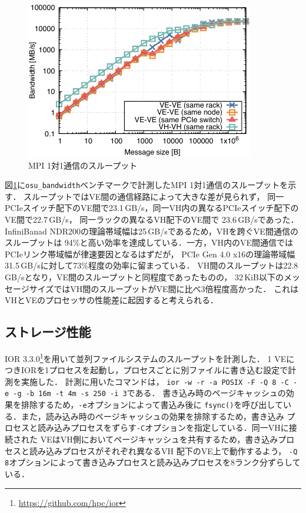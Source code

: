 ﻿\documentclass[submit,techrep,noauthor]{ipsj}
\begin{document}
\begin{figure}[tb]
  \centering
  \includegraphics{figs/mpi_bandwidth.pdf}
  \caption{MPI 1対1通信のスループット}\label{fig:mpi-bw}
\end{figure}

図\ref{fig:mpi-bw}に\verb|osu_bandwidth|ベンチマークで計測したMPI 1対1通信のスループットを示す．
スループットではVE間の通信経路によって大きな差が見られず，
同一PCIeスイッチ配下のVE間で23.1\,GB/s，同一VH内の異なるPCIeスイッチ配下のVE間で22.7\,GB/s，
同一ラックの異なるVH配下のVE間で 23.6\,GB/sであった．
InfiniBanad NDR200の理論帯域幅は25\,GB/sであるため，VHを跨ぐVE間通信のスループットは
94\%と高い効率を達成している．一方，VH内のVE間通信ではPCIeリンク帯域幅が律速要因となるはずだが，
PCIe Gen 4.0 x16の理論帯域幅31.5\,GB/sに対して73\%程度の効率に留まっている．
VH間のスループットは22.8\,GB/sとなり，VE間のスループットと同程度であったものの，
32\,KiB以下のメッセージサイズではVH間のスループットがVE間に比べ3倍程度高かった．
これはVHとVEのプロセッサの性能差に起因すると考えられる．

\subsection{ストレージ性能}\label{sec:storage}

IOR 3.3.0\footnote{\url{https://github.com/hpc/ior}}を用いて並列ファイルシステムのスループットを計測した．
1 VEにつきIORを1プロセスを起動し，プロセスごとに別ファイルに書き込む設定で計測を実施した．
計測に用いたコマンドは，
\texttt{ior -w -r -a POSIX -F -Q 8 -C -e -g -b 16m -t 4m -s 250 -i 3}である．
書き込み時のページキャッシュの効果を排除するため，\texttt{-e}オプションによって書込み後に
\texttt{fsync()}を呼び出している．また，読み込み時のページキャッシュの効果を排除するため，書き込み
プロセスと読み込みプロセスをずらす\texttt{-C}オプションを指定している．同一VHに接続された
VEはVH側においてページキャッシュを共有するため，書き込みプロセスと読み込みプロセスがそれぞれ異なるVH
配下のVE上で動作するよう，
\texttt{-Q 8}オプションによって書き込みプロセスと読み込みプロセスを8ランク分ずらしている．
\end{document}
